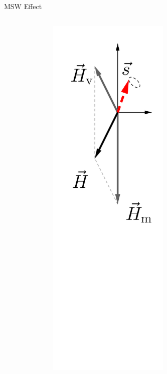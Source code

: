 \documentclass[9pt]{beamer}
\begin{document}
\begin{darkframes}
\begin{frame}{MSW Effect}
{\begin{columns}[T]
\begin{column}{0.33\textwidth}
\end{column}%
\begin{column}{0.33\textwidth}



\begin{figure}
    \centering
    \colorbox{white}{\includegraphics[width=0.6\textwidth]{assets/matter-effect-adiabatic}}
\end{figure}




\end{column}
\end{columns}}
\end{frame}
\end{darkframes}
\end{document}
